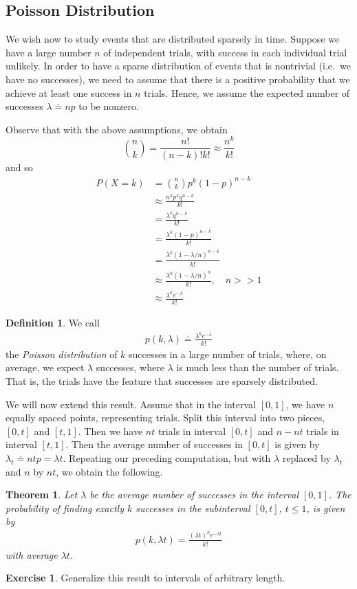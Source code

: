 \documentclass[12pt]{amsbook}
\theoremstyle{plain}
\newtheorem{theorem}{Theorem}
\theoremstyle{definition}
\newtheorem*{definition}{Definition}
\newtheorem*{exercise}{Exercise}
\theoremstyle{remark}
\numberwithin{equation}{section}  %
\begin{document}
\subsection{Poisson Distribution}
We wish now to study events that are distributed sparsely in time.
Suppose we have a large number $n$ of independent trials, with
success in each individual trial unlikely. In order to have a sparse
distribution of events that is nontrivial (i.e.\ we have no successes),
we need to assume that there is a positive
probability that we achieve at least one success in $n$ trials. Hence, we 
assume the expected number of
successes $\lambda \doteq np$ to be nonzero.

Observe that with the above assumptions, we obtain
\begin{equation*}
	\binom{n}{k} = \frac{n!}{(n-k)! k!} \approx \frac{n^k}{k!}
\end{equation*}
and so
\begin{align*}
	P(X = k)
	& = \binom{n}{k} p^k {(1 - p)}^{n-k} \\
	& \approx \frac{n^k p^k q^{n-k}}{k!} \\
	& = \frac{\lambda^k q^{n-k}}{k!} \\
	& = \frac{\lambda^k {(1-p)}^{n-k}}{k!} \\
	& = \frac{\lambda^k {(1-\lambda/n)}^{n-k}}{k!} \\
	& \approx \frac{\lambda^k {(1-\lambda/n)}^{n}}{k!} , \quad n >> 1\\
	& \approx \frac{\lambda^k e^{-\lambda}}{k!}
\end{align*}
\begin{definition}
	We call
	\begin{align*}
		p(k, \lambda) \doteq \frac{\lambda^k e^{-\lambda}}{k!}
	\end{align*}
	the \emph{Poisson distribution} of $k$ successes in a large number
	of trials, where, on average, we expect $\lambda$ successes,
	where $\lambda$ is much less than the number of trials.
	That is, the trials have the feature that successes are
	sparsely distributed.
\end{definition}
We will now extend this result. Assume that in the interval $[0,1]$,
we have $n$ equally spaced points, representing trials. Split this interval 
into two pieces,
$[0,t]$ and $[t, 1]$. Then we have $nt$ trials in interval $[0,t]$ and
$n - nt$ trials in interval $[t,1]$. Then the average number of successes
in $[0,t]$ is given by $\lambda_t \doteq n t p = \lambda t$. Repeating
our preceding computation, but with $\lambda$ replaced by $\lambda_t$
and $n$ by $nt$, we obtain the following.
\begin{theorem}
	Let $\lambda$ be the average number of successes in the interval $[0,1]$.
	The probability of finding exactly $k$ successes  in the subinterval 
	$[0,t]$,
	$t \le 1$, is given by
	\begin{align*}
		p(k, \lambda t) = \frac{{(\lambda t)}^{k} e^{-\lambda t}}{k!}
	\end{align*}
	with average $\lambda t$.
\end{theorem}
\begin{exercise}
	Generalize this result to intervals of arbitrary length.
\end{exercise}
\end{document}

